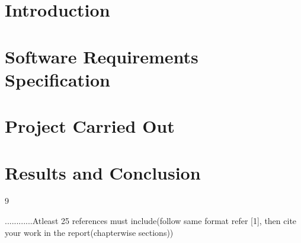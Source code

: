 \documentclass[12pt,a4paper,oneside]{memoir}
\begin{document}
\chapter{Introduction}

\chapter{Software Requirements Specification}

\chapter{Project Carried Out}

\chapter{Results and Conclusion}

\newpage 

\renewcommand{\bibname}{References}
\renewcommand{\refname}{References}


\begin{thebibliography}{9}
 
 
............Atleast 25 references must include(follow same format refer [1], then cite your work in the report(chapterwise sections))
\end{thebibliography}

\nocite{*}


\end{document}
